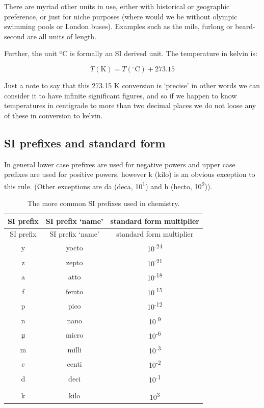 \documentclass[
]{book}
\begin{document}
There are myriad other units in use, either with historical or geographic preference, or just for niche purposes (where would we be without olympic swimming pools or London buses). Examples such as the mile, furlong or beard-second are all units of length.

Further, the unit ºC is formally an SI derived unit. The temperature in kelvin is:

{
\begin{equation*}
T (\textrm{K}) = T (^\circ \textrm{C}) + 273.15
\end{equation*}
}

Just a note to say that this 273.15 K conversion is `precise' in other words we can consider it to have infinite significant figures, and so if we happen to know temperatures in centigrade to more than two decimal places we do not loose any of these in conversion to kelvin.

\hypertarget{si-prefixes-and-standard-form}{%
\subsection{SI prefixes and standard form}\label{si-prefixes-and-standard-form}}

In general lower case prefixes are used for negative powers and upper case prefixes are used for positive powers, however k (kilo) is an obvious exception to this rule. (Other exceptions are da (deca, 10\textsuperscript{1}) and h (hecto, 10\textsuperscript{2})).

\begin{longtable}[]{@{}ccc@{}}
\caption{\label{tab:SIprefix} The more common SI prefixes used in chemistry.}\tabularnewline
\toprule
SI prefix & SI prefix `name' & standard form multiplier\tabularnewline
\midrule
\endfirsthead
\toprule
SI prefix & SI prefix `name' & standard form multiplier\tabularnewline
\midrule
\endhead
y & yocto & 10\textsuperscript{-24}\tabularnewline
z & zepto & 10\textsuperscript{-21}\tabularnewline
a & atto & 10\textsuperscript{-18}\tabularnewline
f & femto & 10\textsuperscript{-15}\tabularnewline
p & pico & 10\textsuperscript{-12}\tabularnewline
n & nano & 10\textsuperscript{-9}\tabularnewline
μ & micro & 10\textsuperscript{-6}\tabularnewline
m & milli & 10\textsuperscript{-3}\tabularnewline
c & centi & 10\textsuperscript{-2}\tabularnewline
d & deci & 10\textsuperscript{-1}\tabularnewline
& &\tabularnewline
k & kilo & 10\textsuperscript{3}\tabularnewline
\bottomrule
\end{longtable}
\end{document}
